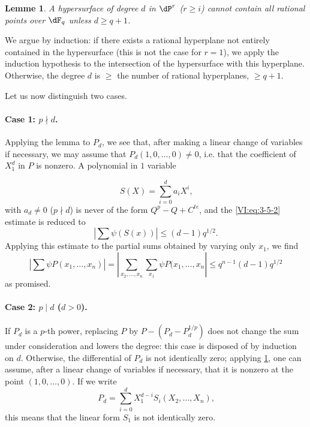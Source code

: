\documentclass[oneside]{book}
\theoremstyle{sga-source}
\theoremstyle{sga-source-dash}
\theoremstyle{sga-source-dotdash}
\theoremstyle{sga-source-number-note-dash}
\theoremstyle{sga-source-note-number-dotdash}
\theoremstyle{sga-source-example-dotdash}
\theoremstyle{sga-source-inline-number}
\theoremstyle{sga-source-bare-number}
\theoremstyle{sga-source}
\newtheorem{lemma_}[subsection]{Lemme}
\newcommand{\PrintPage}[1]{}\newcommand{\MathPage}[1]{}\newcommand{\PrintCite}[2]{#1}\newcommand{\var}[3]{#1}
\begin{document}
\begin{lemma_}\label{VI:3-9}
A hypersurface of degree $d$ in $\dP^r$ (\var{$r\geqslant i$}{$r\geqslant 1$}{S45-SOL-0786}) cannot contain 
all rational points over $\dF_q$ unless $d\geqslant q+1$. 
\end{lemma_}

We argue by induction: if there exists a rational hyperplane not 
entirely contained in the hypersurface (this is not the case for $r=1$), we 
apply the induction hypothesis to the intersection of the hypersurface with this 
hyperplane. Otherwise, the degree $d$ is $\geqslant$ the number of rational 
hyperplanes, $\geqslant q+1$. 

Let us now distinguish two cases. 


\paragraph{Case 1: $p\nmid d$.}
Applying the lemma to $P_d$, we see that, after making a linear change 
of variables if necessary, we may assume that $P_d(1,0,\ldots,0)\ne 0$, i.e. 
that the coefficient of $X_1^d$ in $P$ is nonzero. A polynomial in $1$ 
variable 
\PrintPage{194}
\[
  S(X) = \sum_{i=0}^d a_i X^i \text{,} 
\]
with $a_d\ne 0$ ($p\nmid d$) is never of the form $Q^p-Q+C^{t e}$, and 
the \eqref{VI:eq:3-5-2} estimate is reduced to 
\[
  \left| \sum \psi(S(x)) \right| \leqslant (d-1) q^{1/2} \text{.} 
\]
Applying this estimate to the partial sums obtained by varying 
only $x_1$, we find 
\[
  \left| \sum \psi P(x_1,\dots,x_n) \right| = \left| \var{\sum_{x_2,\dots,x_n} \sum_{x_1} \psi P(x_1,\dots,x_n\right|}{\sum_{x_2,\dots,x_n} \sum_{x_1} \psi P(x_1,\dots,x_n)\right|}{S45-SOL-0792} \leqslant q^{n-1} (d-1) q^{1/2} 
\]
as promised. 


\paragraph{Case 2: $p\mid d$ ($d>0$).}
If $P_d$ is a $p$-th power, replacing $P$ by $P-(P_d-P_d^{1/p})$ 
does not change the sum under consideration and lowers the degree: this case 
is disposed of by induction on $d$. Otherwise, the differential of 
$P_d$ is not identically zero; applying \ref{VI:3-9}, one can assume, 
after a linear change of variables if necessary, that it is nonzero 
at the point $(1,0,\dots,0)$. If we write 
\[
  P_d = \sum_{i=0}^d X_1^{d-i} S_i(X_2,\dots,X_n) \text{,} 
\]
this means that the linear form $S_1$ is not identically zero. 
\end{document}
